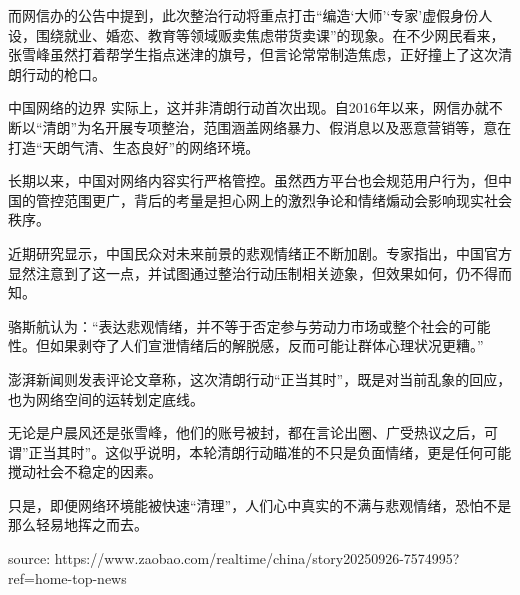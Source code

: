 {而网信办的公告中提到，此次整治行动将重点打击“编造‘大师’‘专家’虚假身份人设，围绕就业、婚恋、教育等领域贩卖焦虑带货卖课”的现象。在不少网民看来，张雪峰虽然打着帮学生指点迷津的旗号，但言论常常制造焦虑，正好撞上了这次清朗行动的枪口。

中国网络的边界
实际上，这并非清朗行动首次出现。自2016年以来，网信办就不断以“清朗”为名开展专项整治，范围涵盖网络暴力、假消息以及恶意营销等，意在打造“天朗气清、生态良好”的网络环境。

长期以来，中国对网络内容实行严格管控。虽然西方平台也会规范用户行为，但中国的管控范围更广，背后的考量是担心网上的激烈争论和情绪煽动会影响现实社会秩序。

近期研究显示，中国民众对未来前景的悲观情绪正不断加剧。专家指出，中国官方显然注意到了这一点，并试图通过整治行动压制相关迹象，但效果如何，仍不得而知。

骆斯航认为：“表达悲观情绪，并不等于否定参与劳动力市场或整个社会的可能性。但如果剥夺了人们宣泄情绪后的解脱感，反而可能让群体心理状况更糟。”

澎湃新闻则发表评论文章称，这次清朗行动“正当其时”，既是对当前乱象的回应，也为网络空间的运转划定底线。

无论是户晨风还是张雪峰，他们的账号被封，都在言论出圈、广受热议之后，可谓”正当其时”。这似乎说明，本轮清朗行动瞄准的不只是负面情绪，更是任何可能搅动社会不稳定的因素。

只是，即便网络环境能被快速“清理”，人们心中真实的不满与悲观情绪，恐怕不是那么轻易地挥之而去。

source: https://www.zaobao.com/realtime/china/story20250926-7574995?ref=home-top-news
}